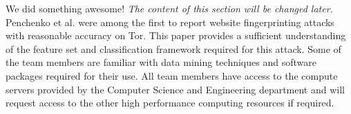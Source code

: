 We did something awesome!
\emph{The content of this section will be changed later.} Penchenko et al. \cite{panchenko11} were among the first to report website fingerprinting attacks with reasonable accuracy on Tor. This paper provides a sufficient understanding of the feature set and classification framework required for this attack. Some of the team members are familiar with data mining techniques and software packages required for their use. All team members have access to the compute servers provided by the Computer Science and Engineering department and will request access to the other high performance computing resources if required.
